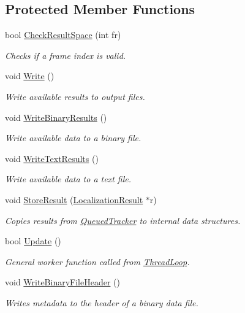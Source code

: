 \subsection*{Protected Member Functions}
\begin{DoxyCompactItemize}
\item 
bool \hyperlink{class_result_manager_ad274290b02aabcaae7cb1052f8aaad14}{Check\+Result\+Space} (int fr)
\begin{DoxyCompactList}\small\item\em Checks if a frame index is valid. \end{DoxyCompactList}\item 
void \hyperlink{class_result_manager_a6a43d521555ef47d76c8a7e9bb8ff87e}{Write} ()
\begin{DoxyCompactList}\small\item\em Write available results to output files. \end{DoxyCompactList}\item 
void \hyperlink{class_result_manager_aafdacba27b69bef50732f72053d21845}{Write\+Binary\+Results} ()
\begin{DoxyCompactList}\small\item\em Write available data to a binary file. \end{DoxyCompactList}\item 
void \hyperlink{class_result_manager_a8e0e6fb46d3d512b11663e1f4c7af5f1}{Write\+Text\+Results} ()
\begin{DoxyCompactList}\small\item\em Write available data to a text file. \end{DoxyCompactList}\item 
void \hyperlink{class_result_manager_aef219e3b0da98522795633ed3e38180c}{Store\+Result} (\hyperlink{struct_localization_result}{Localization\+Result} $\ast$r)
\begin{DoxyCompactList}\small\item\em Copies results from \hyperlink{class_queued_tracker}{Queued\+Tracker} to internal data structures. \end{DoxyCompactList}\item 
bool \hyperlink{class_result_manager_a96d36b8b947374edf13ede8e12822f10}{Update} ()
\begin{DoxyCompactList}\small\item\em General worker function called from \hyperlink{class_result_manager_a0aff477d777703dd9f1e01ba0bd6f2d8}{Thread\+Loop}. \end{DoxyCompactList}\item 
void \hyperlink{class_result_manager_ad67d6303de94c15cbb8de23cf1837270}{Write\+Binary\+File\+Header} ()
\begin{DoxyCompactList}\small\item\em Writes metadata to the header of a binary data file. \end{DoxyCompactList}\end{DoxyCompactItemize}
